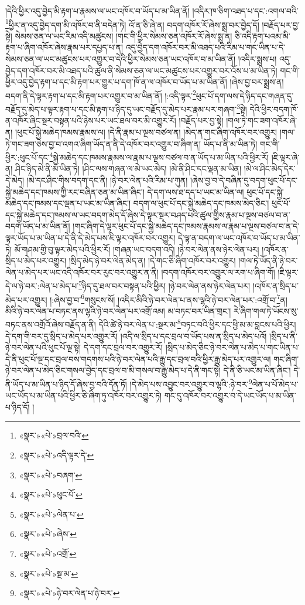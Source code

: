 །དེའི་ཕྱིར་འདུ་བྱེད་མི་རྟག་པ་རྣམས་ལ་ཡང་འཁོར་བ་ཡོད་པ་མ་ཡིན་ནོ། །འདིར་ཁ་ཅིག་འཐད་པ་དང་:འགལ་བའི་\footnote{«སྣར་»«པེ་»བྲལ་བའི་}ཕྱིར་ན་འདུ་བྱེད་དག་མི་འཁོར་བ་ནི་བདེན་ཏེ། འོ་ན་ཅི་ཞེ་ན། བདག་འཁོར་རོ་ཞེས་སྨྲ་བར་བྱེད་དོ། །བརྗོད་པར་བྱ་སྟེ། སེམས་ཅན་ལ་ཡང་རིམ་འདི་མཚུངས། །གང་གི་ཕྱིར་སེམས་ཅན་འཁོར་རོ་ཞེས་སྨྲ་ན། ཅི་འདི་རྟག་པའམ་མི་རྟག་པ་ཞིག་འཁོར་ཞེས་རྣམ་པར་དཔྱད་པ་ན། འདུ་བྱེད་དག་འཁོར་བར་མི་འཐད་པའི་རིམ་པ་གང་ཡིན་པ་དེ་སེམས་ཅན་ལ་ཡང་མཚུངས་པར་འགྱུར་བ་དེའི་ཕྱིར་སེམས་ཅན་ཡང་འཁོར་བ་མ་ཡིན་ནོ། །འདིར་སྨྲས་པ། འདུ་བྱེད་དག་འཁོར་བར་མི་འཐད་པའི་ཚུལ་ནི་སེམས་ཅན་ལ་ཡང་མཚུངས་པར་འགྱུར་བར་འོས་པ་མ་ཡིན་ཏེ། གང་གི་ཕྱིར་འདུ་བྱེད་རྟག་པ་དང་མི་རྟག་པར་གྱུར་པ་དག་ཁོ་ན་ལ་འཁོར་བ་ཡོད་པ་མ་ཡིན་ནོ། །ཞེས་བྱ་བར་སྨྲས་ན། བདག་ནི་དེ་ལྟར་རྟག་པ་དང་མི་རྟག་པར་འགྱུར་བ་མ་ཡིན་ནོ། །:འདི་ལྟར་\footnote{«སྣར་»«པེ་»འདི་ལྟར་དེ་}ཕུང་པོ་དག་ལས་དེ་ཉིད་དང་གཞན་དུ་བརྗོད་དུ་མེད་པ་ལྟར་རྟག་པ་དང་མི་རྟག་པ་ཉིད་དུ་ཡང་བརྗོད་དུ་མེད་པར་རྣམ་པར་གཞག་\footnote{«སྣར་»«པེ་»བཞག་}སྟེ། དེའི་ཕྱིར་བདག་ཁོ་ན་འཁོར་ཞིང་སྔར་བསྟན་པའི་ཉེས་པར་ཡང་ཐལ་བར་མི་འགྱུར་རོ། །བརྗོད་པར་བྱ་སྟེ། །གལ་ཏེ་གང་ཟག་འཁོར་ཞེ་ན། །ཕུང་པོ་སྐྱེ་མཆེད་ཁམས་རྣམས་ལ། །དེ་ནི་རྣམ་པ་ལྔས་བཙལ་ན། །མེད་ན་གང་ཞིག་འཁོར་བར་འགྱུར། །གལ་ཏེ་གང་ཟག་ཅེས་བྱ་བ་འགའ་ཞིག་ཡོད་ན་ནི་དེ་འཁོར་བར་འགྱུར་བ་ཞིག་ན། ཡོད་པ་ནི་མ་ཡིན་ཏེ། གང་གི་ཕྱིར་:ཕུང་པོ་དང་\footnote{«སྣར་»«པེ་»ཕུང་པོ་}སྐྱེ་མཆེད་དང་ཁམས་རྣམས་ལ་རྣམ་པ་ལྔས་བཙལ་བ་ན་ཡོད་པ་མ་ཡིན་པའི་ཕྱིར་རོ། །ཇི་ལྟར་ཞེ་ན། ཤིང་ཉིད་མེ་ནི་མ་ཡིན་ཏེ། །ཤིང་ལས་གཞན་ལ་མེ་ཡང་མེད། །མེ་ནི་ཤིང་དང་ལྡན་མ་ཡིན། །མེ་ལ་ཤིང་མེད་དེར་དེ་མེད། །མེ་དང་ཤིང་གིས་བདག་དང་ནི། །ཉེ་བར་ལེན་པའི་རིམ་པ་ཀུན། །ཞེས་བྱ་བ་དེ་བཞིན་དུ་བདག་ཕུང་པོ་དང་སྐྱེ་མཆེད་དང་ཁམས་ཀྱི་རང་བཞིན་ཅན་མ་ཡིན་ཞིང་། དེ་དག་ལས་ཐ་དད་པ་ཡང་མ་ཡིན་ལ། ཕུང་པོ་དང་སྐྱེ་མཆེད་དང་ཁམས་དང་ལྡན་པ་ཡང་མ་ཡིན་ཞིང་། བདག་ལ་ཕུང་པོ་དང་སྐྱེ་མཆེད་དང་ཁམས་མེད་ཅིང་། ཕུང་པོ་དང་སྐྱེ་མཆེད་དང་ཁམས་ལ་ཡང་བདག་མེད་དོ་ཞེས་དེ་ལྟར་སྔར་བཤད་པའི་ཚུལ་གྱིས་རྣམ་པ་ལྔས་བཙལ་བ་ན་བདག་ཡོད་པ་མ་ཡིན་ནོ། །གང་ཞིག་དེ་ལྟར་ཕུང་པོ་དང་སྐྱེ་མཆེད་དང་ཁམས་རྣམས་ལ་རྣམ་པ་ལྔས་བཙལ་བ་ན་དེ་ལྟར་ཡོད་པ་མ་ཡིན་པ་དེ་ནི་དེ་མེད་པས་ཇི་ལྟར་འཁོར་བར་འགྱུར། དེ་ལྟ་ན་བདག་ལ་ཡང་འཁོར་བ་ཡོད་པ་མ་ཡིན་ཏེ། མོ་གཤམ་གྱི་བུ་ལྟར་མེད་པའི་ཕྱིར་རོ། །གཞན་ཡང་བདག་འདི། །ཉེ་བར་ལེན་ནས་ཉེར་ལེན་པར། །འཁོར་ན་སྲིད་པ་མེད་པར་འགྱུར། །སྲིད་མེད་ཉེ་བར་ལེན་མེད་ན། །དེ་གང་ཅི་ཞིག་འཁོར་བར་འགྱུར། །གལ་ཏེ་ཡོད་ནི་ཉེ་བར་ལེན་པ་མེད་པར་ཡང་འདི་འཁོར་བར་རུང་བར་འགྱུར་ན་ནི། །བདག་འཁོར་བར་འགྱུར་ལ་རག་པ་ཞིག་གོ། །ཇི་ལྟར་དེ་ལ་ཉེ་བར་:ལེན་པ་མེད་པ་\footnote{«སྣར་»«པེ་»ལེན་པ་}ཉིད་དུ་ཐལ་བར་བསྟན་པའི་ཕྱིར། །ཉེ་བར་ལེན་ནས་ཉེར་ལེན་པར། །འཁོར་ན་སྲིད་པ་མེད་པར་འགྱུར། །:ཞེས་བྱ་བ་\footnote{«སྣར་»«པེ་»ཞེས་}གསུངས་སོ། །འདིར་མིའི་ཉེ་བར་ལེན་པ་ནས་ལྷའི་ཉེ་བར་ལེན་པར་:འགྲོ་བ་\footnote{«སྣར་»«པེ་»འགྲོ་}ན། མིའི་ཉེ་བར་ལེན་པ་བཏང་ནས་ལྷའི་ཉེ་བར་ལེན་པར་འགྲོ་འམ། མ་བཏང་བར་ཡིན་གྲང་། རེ་ཞིག་གལ་ཏེ་ཡོངས་སུ་བཏང་ནས་འགྲོའོ་ཞེས་བརྗོད་ན་ནི། དེའི་ཚེ་ཉེ་བར་ལེན་པ་:སྔར་མ་\footnote{«སྣར་»«པེ་»སྔ་མ་}བཏང་བའི་ཕྱིར་དང་ཕྱི་མ་མ་བླངས་པའི་ཕྱིར། དེ་དག་གི་བར་དུ་སྲིད་པ་མེད་པར་འགྱུར་རོ། །འདི་ལ་སྲིད་པ་དང་བྲལ་བ་ཡོད་པས་ན་སྲིད་པ་མེད་པའོ། །སྲིད་པ་ནི་ཉེ་བར་ལེན་པའི་ཕུང་པོ་ལྔ་སྟེ། དེ་དག་དང་བྲལ་བར་འགྱུར་རོ། །སྲིད་པ་མེད་ཅིང་ཉེ་བར་ལེན་པ་མེད་པ་གང་ཡིན་པ་དེ་ནི་ཕུང་པོ་ལྔ་དང་བྲལ་བས་གདགས་པའི་ཉེ་བར་ལེན་པའི་རྒྱུ་དང་བྲལ་བའི་ཕྱིར་རྒྱུ་མེད་པར་འགྱུར་ལ། གང་ཞིག་ཉེ་བར་ལེན་པ་མེད་ཅིང་གསལ་བྱེད་དང་བྲལ་བ་མི་གསལ་བ་རྒྱུ་མེད་པ་དེ་ནི་གང་སྟེ། དེ་ནི་ཅི་ཡང་མ་ཡིན་ཞིང་། དེ་ནི་ཡོད་པ་མ་ཡིན་པ་ཉིད་དོ་ཞེས་བྱ་བའི་དོན་ཏོ། །དེ་མེད་པས་འབྱུང་བར་འགྱུར་བ་ལྷའི་:ཉེ་བར་\footnote{«སྣར་»«པེ་»ཉེ་བར་ལེན་པ་ཉེ་བར་}ལེན་པ་པོ་མེད་པ་ཡང་ཡོད་པ་མ་ཡིན་པའི་ཕྱིར་ཅི་ཞིག་ཏུ་འཁོར་བར་འགྱུར་ཏེ། གང་དུ་འཁོར་བར་འགྱུར་བ་དེ་ཡང་ཡོད་པ་མ་ཡིན་པ་ཉིད་དོ། །
